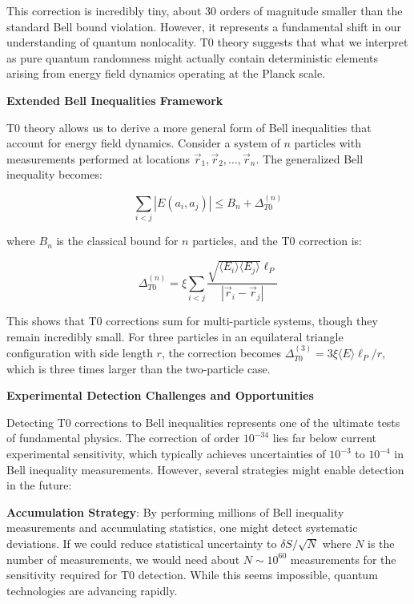\documentclass[12pt,a4paper]{article}
\newcommand{\xipar}{\xi}
\theoremstyle{definition}
\theoremstyle{remark}
\begin{document}
	This correction is incredibly tiny, about 30 orders of magnitude smaller than the standard Bell bound violation. However, it represents a fundamental shift in our understanding of quantum nonlocality. T0 theory suggests that what we interpret as pure quantum randomness might actually contain deterministic elements arising from energy field dynamics operating at the Planck scale.
	
	\textbf{Extended Bell Inequalities Framework}
	
	T0 theory allows us to derive a more general form of Bell inequalities that account for energy field dynamics. Consider a system of $n$ particles with measurements performed at locations $\vec{r}_1, \vec{r}_2, \ldots, \vec{r}_n$. The generalized Bell inequality becomes:
	
	\begin{equation}
		\boxed{\sum_{i<j} |E(a_i, a_j)| \leq B_n + \Delta_{T0}^{(n)}}
		\label{eq:extended_bell}
	\end{equation}
	
	where $B_n$ is the classical bound for $n$ particles, and the T0 correction is:
	
	\begin{equation}
		\Delta_{T0}^{(n)} = \xipar \sum_{i<j} \frac{\sqrt{\langle E_i \rangle \langle E_j \rangle} \ell_P}{|\vec{r}_i - \vec{r}_j|}
		\label{eq:extended_t0_correction}
	\end{equation}
	
	This shows that T0 corrections sum for multi-particle systems, though they remain incredibly small. For three particles in an equilateral triangle configuration with side length $r$, the correction becomes $\Delta_{T0}^{(3)} = 3\xipar \langle E \rangle \ell_P / r$, which is three times larger than the two-particle case.
	
	\textbf{Experimental Detection Challenges and Opportunities}
	
	Detecting T0 corrections to Bell inequalities represents one of the ultimate tests of fundamental physics. The correction of order $10^{-34}$ lies far below current experimental sensitivity, which typically achieves uncertainties of $10^{-3}$ to $10^{-4}$ in Bell inequality measurements. However, several strategies might enable detection in the future:
	
	\textbf{Accumulation Strategy}: By performing millions of Bell inequality measurements and accumulating statistics, one might detect systematic deviations. If we could reduce statistical uncertainty to $\delta S / \sqrt{N}$ where $N$ is the number of measurements, we would need about $N \sim 10^{60}$ measurements for the sensitivity required for T0 detection. While this seems impossible, quantum technologies are advancing rapidly.
	
\end{document}
